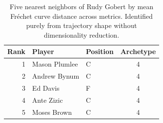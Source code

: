\begin{table}[htbp]
  \centering\small
  \begin{tabular}{rllc}
    \toprule
    Rank & Player & Position & Archetype \\
    \midrule
    1 & Mason Plumlee & C & 4 \\
    2 & Andrew Bynum & C & 4 \\
    3 & Ed Davis & F & 4 \\
    4 & Ante Zizic & C & 4 \\
    5 & Moses Brown & C & 4 \\
    \bottomrule
  \end{tabular}
  \caption{Five nearest neighbors of Rudy Gobert by mean Fr\'{e}chet curve distance across metrics. Identified purely from trajectory shape without dimensionality reduction.}
  \label{tab:Rudy_Gobert_frechet_curve_neighbors}
\end{table}

